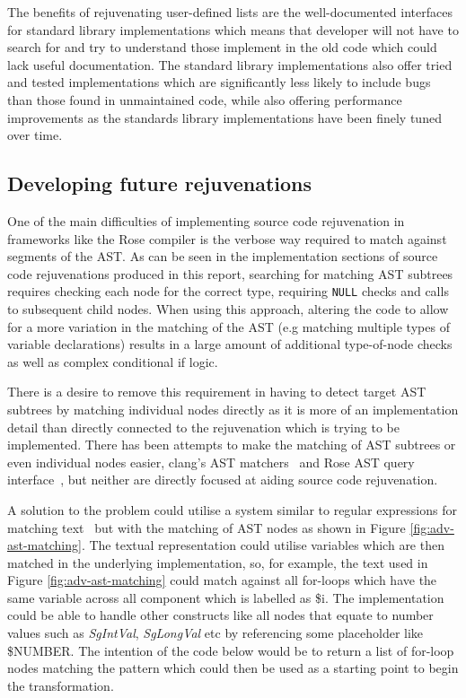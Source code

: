 \documentclass[bsc,frontabs,singlespacing,twoside,parskip,deptreport]{infthesis}
\begin{document}
The benefits of rejuvenating user-defined lists are the well-documented interfaces for standard library implementations which means that developer will not have to search for and try to understand those implement in the old code which could lack useful documentation. The standard library implementations also offer tried and tested implementations which are significantly less likely to include bugs than those found in unmaintained code, while also offering performance improvements as the standards library implementations have been finely tuned over time.

\subsection{Developing future rejuvenations}

One of the main difficulties of implementing source code rejuvenation in frameworks like the Rose compiler is the verbose way required to match against segments of the AST. As can be seen in the implementation sections of source code rejuvenations produced in this report, searching for matching AST subtrees requires checking each node for the correct type, requiring \texttt{NULL} checks and calls to subsequent child nodes. When using this approach, altering the code to allow for a more variation in the matching of the AST (e.g matching multiple types of variable declarations) results in a large amount of additional type-of-node checks as well as complex conditional if logic. 

There is a desire to remove this requirement in having to detect target AST subtrees by matching individual nodes directly as it is more of an implementation detail than directly connected to the rejuvenation which is trying to be implemented. There has been attempts to make the matching of AST subtrees or even individual nodes easier, clang's AST matchers~\cite{CLANG_MATCH_AST} and Rose AST query interface~\cite{ROSE_TUT_AST_QUERY}, but neither are directly focused at aiding source code rejuvenation. 

A solution to the problem could utilise a system similar to regular expressions for matching text~\cite{Aho:1992:FCS:114768} but with the matching of AST nodes as shown in  Figure \ref{fig:adv-ast-matching}. The textual representation could utilise variables which are then matched in the underlying implementation, so, for example, the text used in Figure \ref{fig:adv-ast-matching} could match against all for-loops which have the same variable across all component which is labelled as \$i. The implementation could be able to handle other constructs like all nodes that equate to number values such as \textit{SgIntVal}, \textit{SgLongVal} etc by referencing some placeholder like \$NUMBER. The intention of the code below would be to return a list of for-loop nodes matching the pattern which could then be used as a starting point to begin the transformation.
\end{document}
